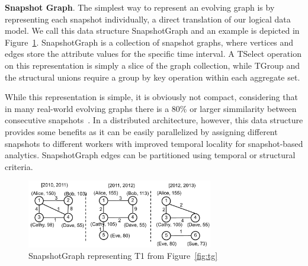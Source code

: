 {\bf Snapshot Graph}. The simplest way to represent an evolving graph
is by representing each snapshot individually, a direct translation of
our logical data model.  We call this data structure SnapshotGraph and
an example is depicted in Figure~\ref{fig:sgp}.  SnapshotGraph is a
collection of snapshot graphs, where vertices and edges store the
attribute values for the specific time interval.  A TSelect operation
on this representation is simply a slice of the graph collection,
while TGroup and the structural unions require a group by key
operation within each aggregate set.

While this representation is simple, it is obviously not compact,
considering that in many real-world evolving graphs there is a 80\% or
larger simmilarity between consecutive
snapshots~\cite{DBLP:journals/tos/MiaoHLWYZPCC15}.  In a distributed
architecture, however, this data structure provides some
benefits as it can be easily parallelized by assigning different
snapshots to different workers with improved temporal locality for
snapshot-based analytics.  SnapshotGraph edges can be partitioned
using temporal or structural criteria.  

\begin{figure}[t!]
\includegraphics[width=3.2in]{figs/sgp.pdf}
\caption{SnapshotGraph representing T1 from Figure~\ref{fig:tg}}
\label{fig:sgp}
\end{figure}

